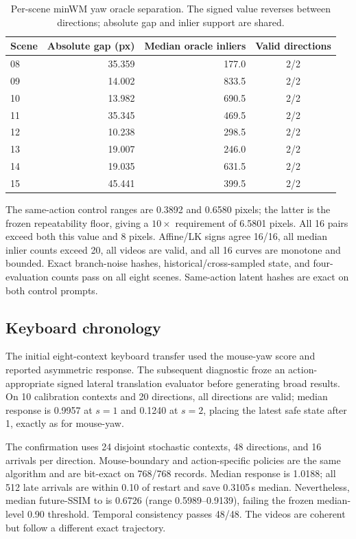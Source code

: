 \begin{table}[h]
  \centering
  \caption{Per-scene minWM yaw oracle separation. The signed value reverses
  between directions; absolute gap and inlier support are shared.}
  \small
  \begin{tabular}{lrrc}
    \toprule
    Scene & Absolute gap (px) & Median oracle inliers & Valid directions \\
    \midrule
    08 & 35.359 & 177.0 & 2/2 \\
    09 & 14.002 & 833.5 & 2/2 \\
    10 & 13.982 & 690.5 & 2/2 \\
    11 & 35.345 & 469.5 & 2/2 \\
    12 & 10.238 & 298.5 & 2/2 \\
    13 & 19.007 & 246.0 & 2/2 \\
    14 & 19.035 & 631.5 & 2/2 \\
    15 & 45.441 & 399.5 & 2/2 \\
    \bottomrule
  \end{tabular}
\end{table}

The same-action control ranges are 0.3892 and 0.6580 pixels; the latter is the
frozen repeatability floor, giving a $10\times$ requirement of 6.5801 pixels.
All 16 pairs exceed both this value and 8 pixels. Affine/LK signs agree 16/16,
all median inlier counts exceed 20, all videos are valid, and all 16 curves are
monotone and bounded. Exact branch-noise hashes, historical/cross-sampled
state, and four-evaluation counts pass on all eight scenes. Same-action latent
hashes are exact on both control prompts.

\subsection{Keyboard chronology}
\label{app:keyboard}

The initial eight-context keyboard transfer used the mouse-yaw score and
reported asymmetric response. The subsequent diagnostic froze an
action-appropriate signed lateral translation evaluator before generating
broad results. On 10 calibration contexts and 20 directions, all directions
are valid; median response is 0.9957 at $s=1$ and 0.1240 at $s=2$, placing the
latest safe state after \nfe{}1, exactly as for mouse-yaw.

The confirmation uses 24 disjoint stochastic contexts, 48 directions, and 16
arrivals per direction. Mouse-boundary and action-specific policies are the
same algorithm and are bit-exact on 768/768 records. Median response is 1.0188;
all 512 late arrivals are within 0.10 of restart and save 0.3105\,s median.
Nevertheless, median future-SSIM to \new{} is 0.6726 (range
0.5989--0.9139), failing the frozen median-level 0.90 threshold. Temporal consistency passes
48/48. The videos are coherent but follow a different exact trajectory.

